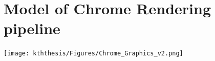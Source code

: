 \documentclass{kththesis}
\begin{document}

\listoffigures
\printbibliography[heading=bibintoc]

\appendix
    \chapter{Model of Chrome Rendering pipeline}
    \label{annex:chrome_model}
    
    \begin{center}
        \texttt{[image: kththesis/Figures/Chrome\_Graphics\_v2.png]}
    \end{center}


\tailmatter
\end{document}
